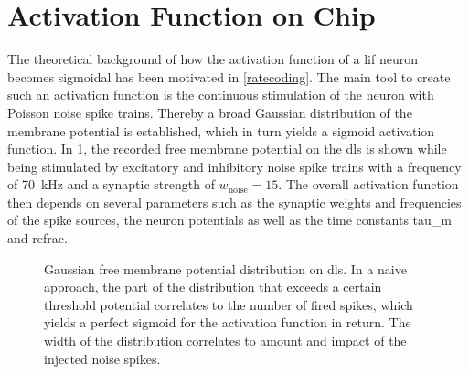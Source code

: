 \section{Activation Function on Chip}
The theoretical background of how the activation function of a \gls{lif} neuron becomes sigmoidal has been motivated in \cref{ratecoding}. The main tool to create such an activation function is the continuous stimulation of the neuron with Poisson noise spike trains. Thereby a broad Gaussian distribution of the membrane potential is established, which in turn yields a sigmoid activation function. In \cref{vleak_w_noise}, the recorded free membrane potential on the \gls{dls} is shown while being stimulated by excitatory and inhibitory noise spike trains with a frequency of \SI{70}{\kilo \Hz} and a synaptic strength of $w_\text{noise}= 15$. The overall activation function then depends on several parameters such as the synaptic weights and frequencies of the spike sources, the neuron potentials as well as the time constants \gls{tau_m} and \gls{refrac}. 

%
\begin{figure}
	\begin{center}
		
	\end{center}
	\caption[Gaussian free membrane potential distribution on \gls{dls}.]{Gaussian free membrane potential distribution on \gls{dls}. In a naive approach, the part of the distribution that exceeds a certain threshold potential correlates to the number of fired spikes, which yields a perfect sigmoid for the activation function in return. The width of the distribution correlates to amount and impact of the injected noise spikes.}
	\label{vleak_w_noise}
\end{figure}



